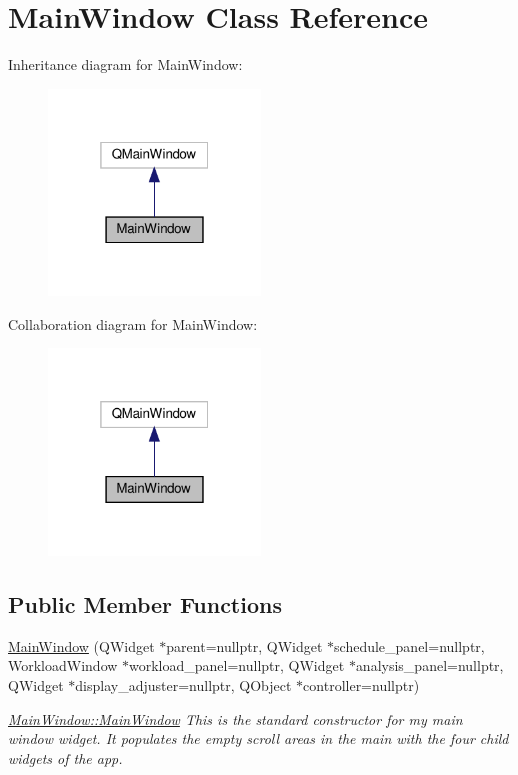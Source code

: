 \hypertarget{classMainWindow}{}\section{Main\+Window Class Reference}
\label{classMainWindow}


Inheritance diagram for Main\+Window\+:\nopagebreak
\begin{figure}[H]
\begin{center}
\leavevmode
\includegraphics[width=160pt]{classMainWindow__inherit__graph}
\end{center}
\end{figure}


Collaboration diagram for Main\+Window\+:\nopagebreak
\begin{figure}[H]
\begin{center}
\leavevmode
\includegraphics[width=160pt]{classMainWindow__coll__graph}
\end{center}
\end{figure}
\subsection*{Public Member Functions}
\begin{DoxyCompactItemize}
\item 
\hyperlink{classMainWindow_a6f640c3030f6a8fafe1a70585e8db0ea}{Main\+Window} (Q\+Widget $\ast$parent=nullptr, Q\+Widget $\ast$schedule\+\_\+panel=nullptr, Workload\+Window $\ast$workload\+\_\+panel=nullptr, Q\+Widget $\ast$analysis\+\_\+panel=nullptr, Q\+Widget $\ast$display\+\_\+adjuster=nullptr, Q\+Object $\ast$controller=nullptr)
\begin{DoxyCompactList}\small\item\em \hyperlink{classMainWindow_a6f640c3030f6a8fafe1a70585e8db0ea}{Main\+Window\+::\+Main\+Window} This is the standard constructor for my main window widget. It populates the empty scroll areas in the main with the four child widgets of the app. \end{DoxyCompactList}\end{DoxyCompactItemize}


